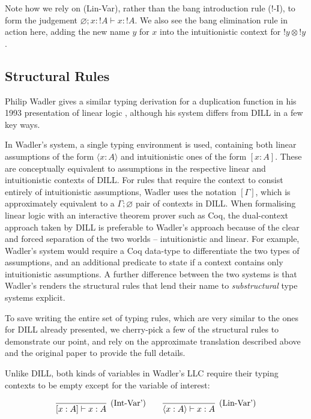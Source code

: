 \documentclass[]{unswthesis}
\let\emptyset\varnothing
\newcommand{\types}{\vdash}
\let\i\textit
\let\t\text
\begin{document}
Note how we rely on (Lin-Var), rather than the bang introduction rule (!-I), to form the judgement $\emptyset; x : {!A} \types x : {!A}$. We also see the bang elimination rule in action here, adding the new name $y$ for $x$ into the intuitionistic context for ${!y} \otimes {!y}$.

\subsection{Structural Rules}

Philip Wadler gives a similar typing derivation for a duplication function in his 1993 presentation of linear logic \cite{wadler93}, although his system differs from DILL in a few key ways.

In Wadler's system, a single typing environment is used, containing both linear assumptions of the form $\langle x : A \rangle$ and intuitionistic ones of the form $[x : A]$. These are conceptually equivalent to assumptions in the respective linear and intuitionistic contexts of DILL. For rules that require the context to consist entirely of intuitionistic assumptions, Wadler uses the notation $[\Gamma]$, which is approximately equivalent to a $\Gamma; \emptyset$ pair of contexts in DILL. When formalising linear logic with an interactive theorem prover such as Coq, the dual-context approach taken by DILL is preferable to Wadler's approach because of the clear and forced separation of the two worlds -- intuitionistic and linear. For example, Wadler's system would require a Coq data-type to differentiate the two types of assumptions, and an additional predicate to state if a context contains only intuitionistic assumptions. A further difference between the two systems is that Wadler's renders the structural rules that lend their name to \i{substructural} type systems explicit.

To save writing the entire set of typing rules, which are very similar to the ones for DILL already presented, we cherry-pick a few of the structural rules to demonstrate our point, and rely on the approximate translation described above and the original paper \cite{wadler93} to provide the full details.

Unlike DILL, both kinds of variables in Wadler's LLC require their typing contexts to be empty except for the variable of interest:

\begin{eqnarray*}
\infer[\t{(Int-Var')}]{[x : A] \types x : A}{} \qquad
\infer[\t{(Lin-Var')}]{\langle x : A \rangle \types x : A}{}
\end{eqnarray*}
\end{document}
